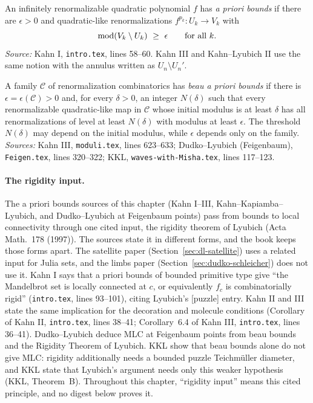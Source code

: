 \begin{definition}
\label{def:series-apriori}
An infinitely renormalizable quadratic polynomial $f$ has \emph{a priori bounds} if there
are $\epsilon>0$ and quadratic-like renormalizations $f^{p_k}\colon U_k\to V_k$ with
\[
\modulus(V_k\setminus U_k)\ \ge\ \epsilon\qquad\text{for all }k.
\]
\emph{Source:} Kahn I, \texttt{intro.tex}, lines 58--60.  Kahn III and Kahn--Lyubich II
use the same notion with the annulus written as $U_n\setminus U_n'$.
\end{definition}

\begin{definition}
\label{def:apriori-beau}
A family $\mathcal C$ of renormalization combinatorics has \emph{beau a priori bounds} if
there is $\epsilon=\epsilon(\mathcal C)>0$ and, for every $\delta>0$, an integer
$N(\delta)$ such that every renormalizable quadratic-like map in $\mathcal C$ whose
initial modulus is at least $\delta$ has all renormalizations of level at least
$N(\delta)$ with modulus at least $\epsilon$.  The threshold $N(\delta)$ may depend on the
initial modulus, while $\epsilon$ depends only on the family.  \emph{Sources:}
Kahn III, \texttt{moduli.tex}, lines 623--633; Dudko--Lyubich (Feigenbaum),
\texttt{Feigen.tex}, lines 320--322; KKL, \texttt{waves-with-Misha.tex}, lines 117--123.
\end{definition}

\paragraph{The rigidity input.}
The a priori bounds sources of this chapter (Kahn I--III, Kahn--Kapiamba--Lyubich, and
Dudko--Lyubich at Feigenbaum points) pass from bounds to local connectivity through one cited
input, the rigidity theorem of Lyubich (Acta Math.~178 (1997)).  The sources state it in different
forms, and the book keeps those forms apart.  The satellite paper (Section~\ref{sec:dl-satellite})
uses a related input for Julia sets, and the limbs paper (Section~\ref{sec:dudko-schleicher})
does not use it.  Kahn I says that a priori bounds of
bounded primitive type give ``the Mandelbrot set is locally connected at $c$, or
equivalently $f_c$ is combinatorially rigid'' (\texttt{intro.tex}, lines 93--101), citing
Lyubich's [puzzle] entry.  Kahn II and III state the same implication for the decoration
and molecule conditions (Corollary of Kahn II, \texttt{intro.tex}, lines 38--41;
Corollary~6.4 of Kahn III, \texttt{intro.tex}, lines 36--41).  Dudko--Lyubich deduce MLC
at Feigenbaum points from beau bounds and the Rigidity Theorem of Lyubich.  KKL show that
beau bounds alone do not give MLC: rigidity additionally needs a bounded puzzle
Teichm\"uller diameter, and KKL state that Lyubich's argument needs only this weaker
hypothesis (KKL, Theorem~B).  Throughout this chapter, ``rigidity input'' means this
cited principle, and no digest below proves it.

